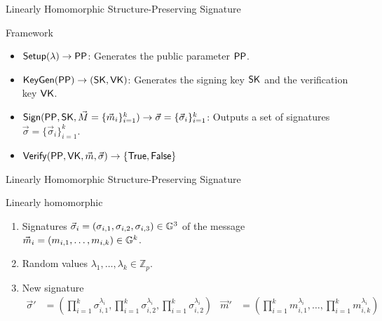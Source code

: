 \begin{frame}{Linearly Homomorphic Structure-Preserving Signature}
  \begin{block}{Framework}
  \begin{itemize}
  \item $\boldmath{{\mathsf{Setup}}(\lambda) \to \mathsf{PP}}$: Generates the public parameter $\mathsf{PP}$.
  \item $\boldmath{{\mathsf{KeyGen}}(\mathsf{PP}) \to (\mathsf{SK}, \mathsf{VK})}$: Generates the signing key $\mathsf{SK}$ and the verification key $\mathsf{VK}$.
  \item $\boldmath{{\mathsf{Sign}}(\mathsf{PP}, \mathsf{SK}, \vec{M} = \{\vec{m}_i\}_{i=1}^k) \to \vec{\sigma} = \{\vec{\sigma}_i\}_{i=1}^k}$: Outputs a set of signatures $\vec{\sigma} = \{\vec{\sigma}_i\}_{i=1}^k$.
  \item $\boldmath{{\mathsf{Verify}}(\mathsf{PP}, \mathsf{VK}, \vec{m}, \vec{\sigma}) \to \{\mathsf{True}, \mathsf{False}\}}$
  \end{itemize}
  \end{block}
\end{frame}

\begin{frame}{Linearly Homomorphic Structure-Preserving Signature}
  \begin{block}{Linearly homomorphic}
    \begin{enumerate}
    \item Signatures $\vec{\sigma}_i = (\sigma_{i,1}, \sigma_{i,2}, \sigma_{i,3}) \in \mathbb{G}^3$ of the message $\vec{m}_i = (m_{i,1}, \dots, m_{i,k}) \in \mathbb{G}^k$.
    \item Random values $\lambda_1, \dots, \lambda_k \in \mathbb{Z}_p$.
    \item New signature
      \begin{align*}
        \vec{\sigma}' &= (\prod_{i = 1}^k \sigma_{i,1}^{\lambda_i}, \prod_{i = 1}^k \sigma_{i,2}^{\lambda_i}, \prod_{i = 1}^k \sigma_{i,2}^{\lambda_i}) & \vec{m}' &= (\prod_{i = 1}^km_{i,1}^{\lambda_i}, \dots, \prod_{i = 1}^km_{i,k}^{\lambda_i})
      \end{align*}
    \end{enumerate}
  \end{block}
\end{frame}


